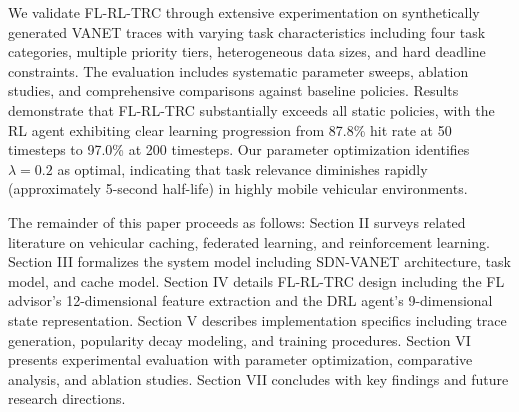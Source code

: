 We validate FL-RL-TRC through extensive experimentation on synthetically generated VANET traces with varying task characteristics including four task categories, multiple priority tiers, heterogeneous data sizes, and hard deadline constraints. The evaluation includes systematic parameter sweeps, ablation studies, and comprehensive comparisons against baseline policies. Results demonstrate that FL-RL-TRC substantially exceeds all static policies, with the RL agent exhibiting clear learning progression from 87.8\% hit rate at 50 timesteps to 97.0\% at 200 timesteps. Our parameter optimization identifies $\lambda = 0.2$ as optimal, indicating that task relevance diminishes rapidly (approximately 5-second half-life) in highly mobile vehicular environments.

The remainder of this paper proceeds as follows: Section II surveys related literature on vehicular caching, federated learning, and reinforcement learning. Section III formalizes the system model including SDN-VANET architecture, task model, and cache model. Section IV details FL-RL-TRC design including the FL advisor's 12-dimensional feature extraction and the DRL agent's 9-dimensional state representation. Section V describes implementation specifics including trace generation, popularity decay modeling, and training procedures. Section VI presents experimental evaluation with parameter optimization, comparative analysis, and ablation studies. Section VII concludes with key findings and future research directions.
